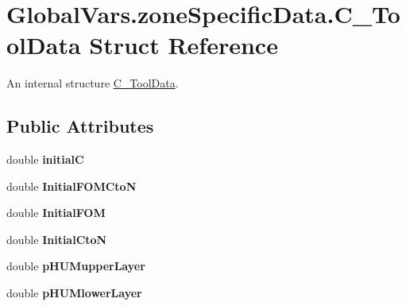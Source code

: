 \hypertarget{struct_global_vars_1_1zone_specific_data_1_1_c___tool_data}{}\section{Global\+Vars.\+zone\+Specific\+Data.\+C\+\_\+\+Tool\+Data Struct Reference}
\label{struct_global_vars_1_1zone_specific_data_1_1_c___tool_data}


An internal structure \mbox{\hyperlink{struct_global_vars_1_1zone_specific_data_1_1_c___tool_data}{C\+\_\+\+Tool\+Data}}.  


\subsection*{Public Attributes}
\begin{DoxyCompactItemize}
\item 
\mbox{\label{struct_global_vars_1_1zone_specific_data_1_1_c___tool_data_a84e3d04eadc6033affa964091eb03ac1}} 
double {\bfseries initialC}
\item 
\mbox{\label{struct_global_vars_1_1zone_specific_data_1_1_c___tool_data_ab34f87354c9761890d2f83b7c55297a9}} 
double {\bfseries Initial\+F\+O\+M\+CtoN}
\item 
\mbox{\label{struct_global_vars_1_1zone_specific_data_1_1_c___tool_data_a414921dd1837684b350387e03bc5cac4}} 
double {\bfseries Initial\+F\+OM}
\item 
\mbox{\label{struct_global_vars_1_1zone_specific_data_1_1_c___tool_data_a483776f1afdd2bd1858a877140164d12}} 
double {\bfseries Initial\+CtoN}
\item 
\mbox{\label{struct_global_vars_1_1zone_specific_data_1_1_c___tool_data_a3a386d161b62ea999c64d6cc167d1c71}} 
double {\bfseries p\+H\+U\+Mupper\+Layer}
\item 
\mbox{\label{struct_global_vars_1_1zone_specific_data_1_1_c___tool_data_a21f609c9041765da06076796a4457407}} 
double {\bfseries p\+H\+U\+Mlower\+Layer}
\end{DoxyCompactItemize}


